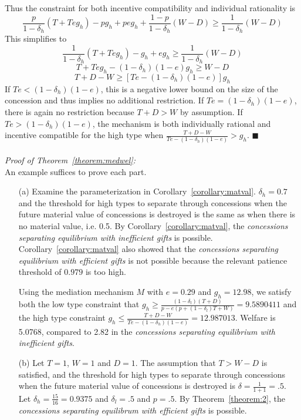 \documentclass[12pt, letterpaper]{article}
\newcommand{\de}{\delta}
\begin{document}
{Thus the constraint for both incentive compatibility and individual rationality is
\begin{equation*}
  \frac{p}{1-\de_h}\left(T + Teg_h \right) - pg_h +peg_h+ \frac{1-p}{1-\de_h}\left(W-D\right) \geq \frac{1}{1-\de_h}\left(W-D\right)
\end{equation*}
This simplifies to
\begin{equation*}
  \frac{1}{1-\de_h}\left(T + Teg_h \right) - g_h +eg_h \geq \frac{1	}{1-\de_h}\left(W-D\right)
\end{equation*}
\begin{equation*}
  T + Teg_h - (1-\de_h)(1-e)g_h \geq W-D
\end{equation*}
\begin{equation*}
  T + D - W \geq \left[Te - (1-\de_h)(1-e)\right]g_h 
\end{equation*}
If $Te < (1-\de_h)(1-e)$, this is a negative lower bound on the size of the concession and thus implies no additional restriction. If $Te = (1-\de_h)(1-e)$, there is again no restriction because $T+D >W$ by assumption. If $Te > (1-\de_h)(1-e)$, the mechanism is both individually rational and incentive compatible for the high type when $\frac{ T + D - W}{Te - (1-\de_h)(1-e)}>g_h$. \hfill $\blacksquare$\\
\\
\emph{Proof of Theorem~\ref{theorem:medwel}:}\\
An example suffices to prove each part.
	\begin{enumerate}
		\item[(a)] Examine the parameterization in Corollary~\ref{corollary:matval}. $\de_h = 0.7$ and the threshold for high types to separate through concessions when the future material value of concessions is destroyed is the same as when there is no material value, i.e. 0.5. By Corollary~\ref{corollary:matval}, the \emph{concessions separating equilibrium with inefficient gifts} is possible. Corollary~\ref{corollary:matval} also showed that the \emph{concessions separating equilibrium with efficient gifts} is not possible because the relevant patience threshold of $0.979$ is too high. 

Using the mediation mechanism $M$ with $e=0.29$ and $g_h=12.98$, we satisfy both the low type constraint that $g_h\geq \frac{\left(1 - \de_l \right)\left(T +D \right)}{p - e\left(p +(1-\de_l)T +W \right)}=9.5890411$ and the high type constraint $g_h\leq \frac{ T + D - W}{Te - (1-\de_h)(1-e)}=12.987013$. Welfare is 5.0768, compared to 2.82 in the \emph{concessions separating equilibrium with inefficient gifts}.
		\item[(b)] Let $T = 1$, $W=1$ and $D = 1$. The assumption that $T > W - D$ is satisfied, and the threshold for high types to separate through concessions when the future material value of concessions is destroyed is $\de = \frac{1}{1+1} = .5$. Let $\de_h = \frac{15}{16}=0.9375$ and $\de_l = .5$ and $p = .5$. By Theorem~\ref{theorem:2}, the \emph{concessions separating equilibrum with efficient gifts} is possible.


\end{enumerate}}
\end{document}
